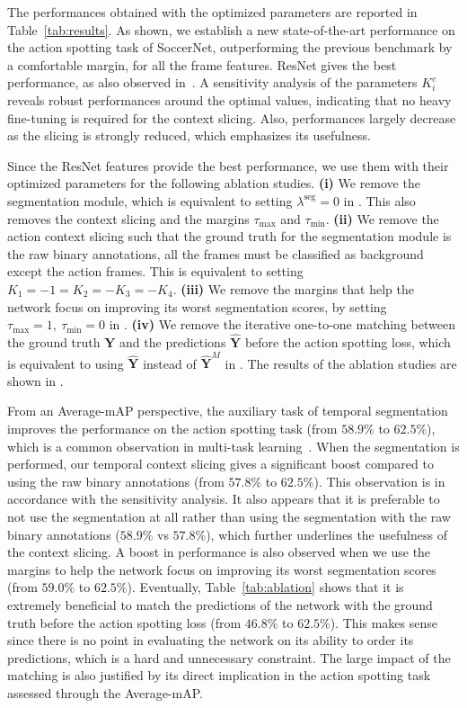 \documentclass[10pt,twocolumn,letterpaper]{article}
\begin{document}
The performances obtained with the optimized parameters are reported in Table~\ref{tab:results}. As shown, we establish a new state-of-the-art performance on the action spotting task of SoccerNet, outperforming the previous benchmark by a comfortable margin, for all the frame features. ResNet gives the best performance, as also observed in~\cite{Giancola_2018_CVPR_Workshops}. A sensitivity analysis of the parameters $K_i^c$ reveals robust performances around the optimal values, indicating that no heavy fine-tuning is required for the context slicing. Also, performances largely decrease as the slicing is strongly reduced, which emphasizes its usefulness. 


Since the ResNet features provide the best performance, we use them with their optimized parameters for the following ablation studies. \textbf{(i)} We remove the segmentation module, which is equivalent to setting $\lambda^\text{seg}=0$ in . This also removes the context slicing and the margins $\tau_\text{max}$ and $\tau_\text{min}$. \textbf{(ii)} We remove the action context slicing such that the ground truth for the segmentation module is the raw binary annotations, \ie all the frames must be classified as background except the action frames. This is equivalent to setting $K_1=-1=K_2=-K_3=-K_4$. \textbf{(iii)} We remove the margins that help the network focus on improving its worst segmentation scores, by setting $\tau_\text{max}=1,\ \tau_\text{min}=0$ in . \textbf{(iv)} We remove the iterative one-to-one matching between the ground truth $\textbf{Y}$ and the predictions $\hat{\textbf{Y}}$ before the action spotting loss, which is equivalent to using $\hat{\textbf{Y}}$ instead of $\hat{\textbf{Y}}^M$ in . The results of the ablation studies are shown in .


From an Average-mAP perspective, the auxiliary task of temporal segmentation improves the performance on the action spotting task (from $58.9\%$ to $62.5\%$), which is a common observation in multi-task learning~\cite{Zamir_2018_CVPR}. When the segmentation is performed, our temporal context slicing gives a significant boost compared to using the raw binary annotations (from $57.8\%$ to $62.5\%$). This observation is in accordance with the sensitivity analysis. It also appears that it is preferable to not use the segmentation at all rather than using the segmentation with the raw binary annotations ($58.9\%$ vs $57.8\%$), which further underlines the usefulness of the context slicing. A boost in performance is also observed when we use the margins to help the network focus on improving its worst segmentation scores (from $59.0\%$ to $62.5\%$). Eventually, Table~\ref{tab:ablation} shows that it is extremely beneficial to match the predictions of the network with the ground truth before the action spotting loss (from $46.8\%$ to $62.5\%$). This makes sense since there is no point in evaluating the network on its ability to order its predictions, which is a hard and unnecessary constraint. The large impact of the matching is also justified by its direct implication in the action spotting task assessed through the Average-mAP.
\end{document}
